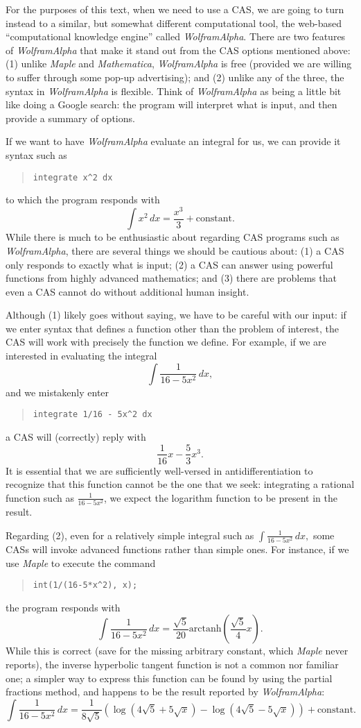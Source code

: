 For the purposes of this text, when we need to use a CAS, we are going to turn instead to a similar, but somewhat different computational tool, the web-based ``computational knowledge engine'' called \emph{WolframAlpha}.  There are two features of \emph{WolframAlpha} that make it stand out from the CAS options mentioned above:  (1) unlike \emph{Maple} and \emph{Mathematica}, \emph{WolframAlpha} is free (provided we are willing to suffer through some pop-up advertising); and (2) unlike any of the three, the syntax in  \emph{WolframAlpha} is flexible.  Think of  \emph{WolframAlpha} as being a little bit like doing a Google search: the program will interpret what is input, and then provide a summary of options.

If we want to have \emph{WolframAlpha} evaluate an integral for us, we can provide it syntax such as
\begin{quote}
\texttt{integrate x\^{}2 dx}
\end{quote}
to which the program responds with
$$\int x^2 \, dx = \frac{x^3}{3} + \mbox{constant}.$$
While there is much to be enthusiastic about regarding CAS programs such as \emph{WolframAlpha}, there are several things we should be cautious about:  (1) a CAS only responds to exactly what is input; (2) a CAS can answer using powerful functions from highly advanced mathematics; and (3) there are problems that even a CAS cannot do without additional human insight.

Although (1) likely goes without saying, we have to be careful with our input:  if we enter syntax that defines a function other than the problem of interest, the CAS will work with precisely the function we define.  For example, if we are interested in evaluating the integral
$$\int \frac{1}{16-5x^2} \, dx,$$
and we mistakenly enter 
\begin{quote}
\texttt{integrate 1/16 - 5x\^{}2 dx}
\end{quote}
a CAS will (correctly) reply with 
$$\frac{1}{16}x - \frac{5}{3} x^3.$$
It is essential that we are sufficiently well-versed in antidifferentiation to recognize that this function cannot be the one that we seek:  integrating a rational function such as $\frac{1}{16-5x^2}$, we expect the logarithm function to be present in the result.

Regarding (2), even for a relatively simple integral such as $\int \frac{1}{16-5x^2} \, dx,$ some CASs will invoke advanced functions rather than simple ones.  For instance, if we use \emph{Maple} to execute the command
\begin{quote}
\texttt{int(1/(16-5*x\^{}2), x);}
\end{quote}
the program responds with 
$$\int \frac{1}{16-5x^2} \, dx = \frac{\sqrt{5}}{20} \mbox{arctanh}(\frac{\sqrt{5}}{4}x).$$
While this is correct (save for the missing arbitrary constant, which \emph{Maple} never reports), the inverse hyperbolic tangent function is not a common nor familiar one; a simpler way to express this function can be found by using the partial fractions method, and happens to be the result reported by \emph{WolframAlpha}:
$$\int \frac{1}{16-5x^2} \, dx = \frac{1}{8\sqrt{5}} \left(\log(4\sqrt{5}+5\sqrt{x}) - \log(4\sqrt{5}-5\sqrt{x})\right) + \mbox{constant}.$$

